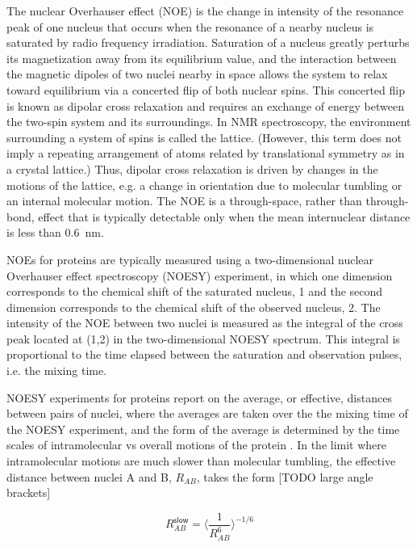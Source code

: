 \documentclass[9pt,review]{livecoms}
\begin{document}
The nuclear Overhauser effect (NOE) is the change in intensity of the resonance peak of one nucleus that occurs when the resonance of a nearby nucleus is saturated by radio frequency irradiation.
Saturation of a nucleus greatly perturbs its magnetization away from its equilibrium value, and the interaction between the magnetic dipoles of two nuclei nearby in space allows the system to relax toward equilibrium via a concerted flip of both nuclear spins.
This concerted flip is known as dipolar cross relaxation and requires an exchange of energy between the two-spin system and its surroundings.
In NMR spectroscopy, the environment surrounding a system of spins is called the lattice.
(However, this term does not imply a repeating arrangement of atoms related by translational symmetry as in a crystal lattice.)
Thus, dipolar cross relaxation is driven by changes in the motions of the lattice, e.g. a change in orientation due to molecular tumbling or an internal molecular motion.
The NOE is a through-space, rather than through-bond, effect that is typically detectable only when the mean internuclear distance is less than \qty{0.6}{\nano\meter}.

NOEs for proteins are typically measured using a two-dimensional nuclear Overhauser effect spectroscopy (NOESY) experiment, in which one dimension corresponds to the chemical shift of the saturated nucleus, 1 and the second dimension corresponds to the chemical shift of the observed nucleus, 2.
The intensity of the NOE between two nuclei is measured as the integral of the cross peak located at (1,2) in the two-dimensional NOESY spectrum.
This integral is proportional to the time elapsed between the saturation and observation pulses, i.e. the mixing time.

NOESY experiments for proteins report on the average, or effective, distances between pairs of nuclei, where the averages are taken over the the mixing time of the NOESY experiment, and the form of the average is determined by the time scales of intramolecular vs overall motions of the protein \cite{neuhaus_nuclear_2000,vogeli_nuclear_2014}.
In the limit where intramolecular motions are much slower than molecular tumbling, the effective distance between nuclei A and B, $R_{AB}$, takes the form [TODO large angle brackets]

\begin{equation}
\label{eqn:noe_R_slow}
R_{AB}^{\mathsf{slow}} = \langle \frac {1} {R_{AB}^6} \rangle^{-1/6}
\end{equation}
\end{document}
